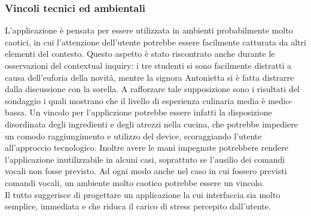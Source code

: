 \subsubsection{Vincoli tecnici ed ambientali}
L'applicazione è pensata per essere utilizzata in ambienti probabilmente
molto caotici, in cui l'attenzione dell'utente potrebbe essere
facilmente catturata da altri elementi del contesto. Questo aspetto è
stato riscontrato anche durante le osservazioni del contextual inquiry:
i tre studenti si sono facilmente distratti a causa dell'euforia della
novità, mentre la signora Antonietta si è fatta distrarre dalla
discussione con la sorella. A rafforzare tale supposizione sono i
risultati del sondaggio i quali mostrano che il livello di esperienza
culinaria media è medio-bassa.
Un vincolo per l'appliczione
potrebbe essere infatti la disposizione disordinata degli ingredienti
e degli atrezzi nella cucina, che potrebbe impediere un comodo
raggiungimento e utilizzo del
device, scoraggiando l'utente all'approccio tecnologico. Inoltre
avere le mani impegnate potrebbere rendere l'applicazione inutilizzabile
in alcuni casi, soprattuto se l'ausilio dei comandi vocali non fosse
previsto. Ad ogni modo anche nel caso in cui fossero previsti comandi vocali,
un ambiente molto caotico potrebbe essere un vincolo.\\
Il tutto suggerisce di progettare un applicazione la cui interfaccia sia
molto semplice, immediata e che riduca il carico di stress
percepito dall'utente.

